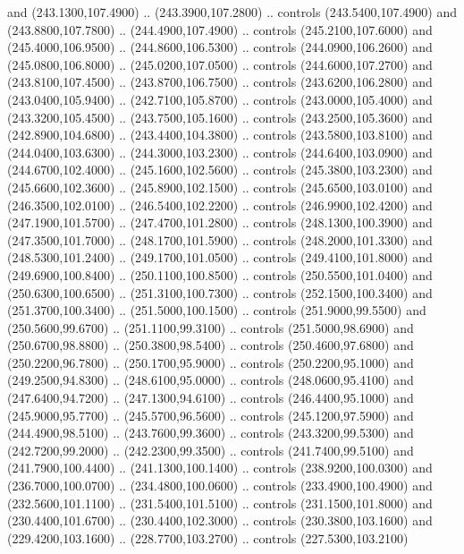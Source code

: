 {\begin{scope}[y=0.80pt, x=0.80pt, yscale=-1, xscale=1, inner sep=0pt, outer sep=0pt, #1]
      and (243.1300,107.4900) .. (243.3900,107.2800) .. controls (243.5400,107.4900)
      and (243.8800,107.7800) .. (244.4900,107.4900) .. controls (245.2100,107.6000)
      and (245.4000,106.9500) .. (244.8600,106.5300) .. controls (244.0900,106.2600)
      and (245.0800,106.8000) .. (245.0200,107.0500) .. controls (244.6000,107.2700)
      and (243.8100,107.4500) .. (243.8700,106.7500) .. controls (243.6200,106.2800)
      and (243.0400,105.9400) .. (242.7100,105.8700) .. controls (243.0000,105.4000)
      and (243.3200,105.4500) .. (243.7500,105.1600) .. controls (243.2500,105.3600)
      and (242.8900,104.6800) .. (243.4400,104.3800) .. controls (243.5800,103.8100)
      and (244.0400,103.6300) .. (244.3000,103.2300) .. controls (244.6400,103.0900)
      and (244.6700,102.4000) .. (245.1600,102.5600) .. controls (245.3800,103.2300)
      and (245.6600,102.3600) .. (245.8900,102.1500) .. controls (245.6500,103.0100)
      and (246.3500,102.0100) .. (246.5400,102.2200) .. controls (246.9900,102.4200)
      and (247.1900,101.5700) .. (247.4700,101.2800) .. controls (248.1300,100.3900)
      and (247.3500,101.7000) .. (248.1700,101.5900) .. controls (248.2000,101.3300)
      and (248.5300,101.2400) .. (249.1700,101.0500) .. controls (249.4100,101.8000)
      and (249.6900,100.8400) .. (250.1100,100.8500) .. controls (250.5500,101.0400)
      and (250.6300,100.6500) .. (251.3100,100.7300) .. controls (252.1500,100.3400)
      and (251.3700,100.3400) .. (251.5000,100.1500) .. controls (251.9000,99.5500)
      and (250.5600,99.6700) .. (251.1100,99.3100) .. controls (251.5000,98.6900)
      and (250.6700,98.8800) .. (250.3800,98.5400) .. controls (250.4600,97.6800)
      and (250.2200,96.7800) .. (250.1700,95.9000) .. controls (250.2200,95.1000)
      and (249.2500,94.8300) .. (248.6100,95.0000) .. controls (248.0600,95.4100)
      and (247.6400,94.7200) .. (247.1300,94.6100) .. controls (246.4400,95.1000)
      and (245.9000,95.7700) .. (245.5700,96.5600) .. controls (245.1200,97.5900)
      and (244.4900,98.5100) .. (243.7600,99.3600) .. controls (243.3200,99.5300)
      and (242.7200,99.2000) .. (242.2300,99.3500) .. controls (241.7400,99.5100)
      and (241.7900,100.4400) .. (241.1300,100.1400) .. controls (238.9200,100.0300)
      and (236.7000,100.0700) .. (234.4800,100.0600) .. controls (233.4900,100.4900)
      and (232.5600,101.1100) .. (231.5400,101.5100) .. controls (231.1500,101.8000)
      and (230.4400,101.6700) .. (230.4400,102.3000) .. controls (230.3800,103.1600)
      and (229.4200,103.1600) .. (228.7700,103.2700) .. controls (227.5300,103.2100)

\end{scope}}
